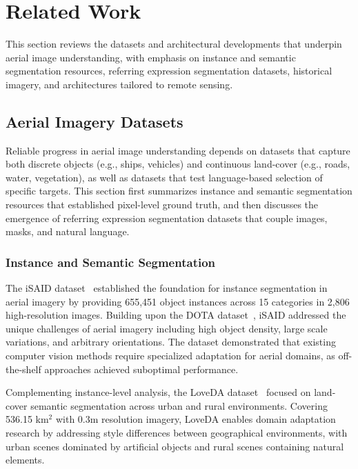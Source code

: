 \documentclass[journal]{IEEEtran}
\begin{document}
\section{Related Work}
\label{sec:related}

This section reviews the datasets and architectural developments that underpin aerial image understanding, with emphasis on instance and semantic segmentation resources, referring expression segmentation datasets, historical imagery, and architectures tailored to remote sensing.

\subsection{Aerial Imagery Datasets}

Reliable progress in aerial image understanding depends on datasets that capture both discrete objects (e.g., ships, vehicles) and continuous land-cover (e.g., roads, water, vegetation), as well as datasets that test language-based selection of specific targets. This section first summarizes instance and semantic segmentation resources that established pixel-level ground truth, and then discusses the emergence of referring expression segmentation datasets that couple images, masks, and natural language.

\subsubsection{Instance and Semantic Segmentation}

The iSAID dataset~\cite{zamir2019isaid} established the foundation for instance segmentation in aerial imagery by providing 655,451 object instances across 15 categories in 2,806 high-resolution images. Building upon the DOTA dataset~\cite{xia2018dota}, iSAID addressed the unique challenges of aerial imagery including high object density, large scale variations, and arbitrary orientations. The dataset demonstrated that existing computer vision methods require specialized adaptation for aerial domains, as off-the-shelf approaches achieved suboptimal performance.

Complementing instance-level analysis, the LoveDA dataset~\cite{wang2021loveda} focused on land-cover semantic segmentation across urban and rural environments. Covering 536.15 km$^2$ with 0.3m resolution imagery, LoveDA enables domain adaptation research by addressing style differences between geographical environments, with urban scenes dominated by artificial objects and rural scenes containing natural elements.
\end{document}
